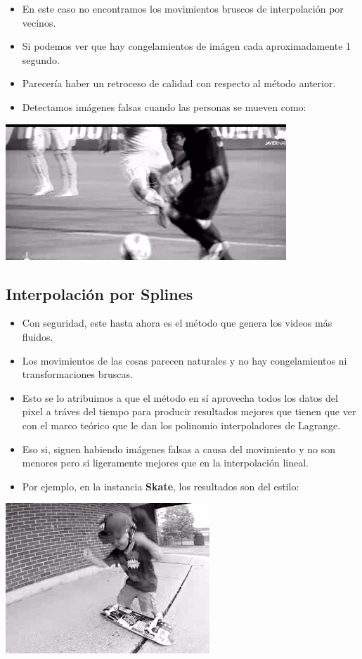 \begin{itemize}
\item En este caso no encontramos los movimientos bruscos de interpolación por vecinos.
\item Si podemos ver que hay congelamientos de imágen cada aproximadamente 1 segundo.
\item Parecería haber un retroceso de calidad con respecto al método anterior.
\item Detectamos imágenes falsas cuando las personas se mueven como:
\end{itemize}

\includegraphics[scale=1]{imagenes/art1.png}

\subsection{Interpolación por Splines}

\begin{itemize}
\item Con seguridad, este hasta ahora es el método que genera los videos más fluidos.
\item Los movimientos de las cosas parecen naturales y no hay congelamientos ni transformaciones bruscas.
\item Esto se lo atribuimos a que el método en sí aprovecha todos los datos del pixel a tráves del tiempo para producir resultados mejores que tienen que ver con el marco teórico que le dan los polinomio interpoladores de Lagrange.
\item Eso si, siguen habiendo imágenes falsas a causa del movimiento y no son menores pero si ligeramente mejores que en la interpolación lineal.
\item Por ejemplo, en la instancia \textbf{Skate}, los resultados son del estilo:
\end{itemize}

\includegraphics[scale=1]{imagenes/art2.png}

